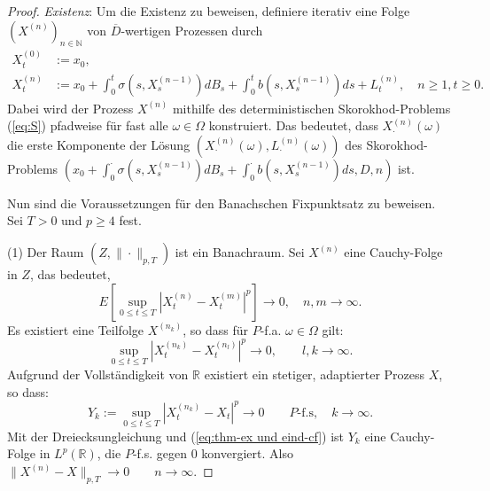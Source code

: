 \documentclass[10pt, a4paper, leqno, twoside, bibliography=totocnumbered, final]{scrartcl}
\theoremstyle{definition}
\theoremstyle{plain}%
\theoremstyle{remark}
\begin{document}
\begin{proof}
\emph{Existenz}: Um die Existenz zu beweisen, definiere iterativ eine Folge $ (X^{(n)})_{n \in \mathbb{N}} $ von $ \overline{D} $-wertigen Prozessen durch
\begin{align*}
X_{t}^{(0)} & := x_{0},\\
X_{t}^{(n)} & := x_{0} + \int_0^t \sigma (s, X_{s}^{(n-1)}) dB_s + \int_0^t b(s, X_{s}^{(n-1)}) ds + L^{(n)}_t, \quad n \geq 1, t \geq 0.
\end{align*}
Dabei wird der Prozess $ X^{(n)} $ mithilfe des deterministischen Skorokhod-Problems (\ref{eq:S}) pfadweise für fast alle $ \omega \in \Omega $ konstruiert. Das bedeutet, dass $ X^{(n)}_{\cdot}(\omega) $ die erste Komponente der Lösung $ ( X^{(n)}_{\cdot}(\omega), L^{(n)}_{\cdot}(\omega) ) $ des Skorokhod-Problems $ (x_{0} + \int_0^{\cdot} \sigma (s, X_{s}^{(n-1)}) dB_s + \int_0^{\cdot} b(s, X_{s}^{(n-1)}) ds, D, n ) $ ist.

Nun sind die Voraussetzungen für den Banachschen Fixpunktsatz zu beweisen. Sei $ T >0 $ und $ p \geq 4 $ fest.

(1) Der Raum $ ( Z , \| \cdot \|_{p,T} ) $ ist ein Banachraum.
Sei $ X^{(n)} $ eine Cauchy-Folge in $ Z $, das bedeutet,
\begin{equation}
\label{eq:thm-ex und eind-cf}
E \left[ \sup_{0 \leq t \leq T} \left| X^{(n)}_t - X^{(m)}_t \right|^p  \right] \to 0, \quad n,m \to \infty.
\end{equation}
Es existiert eine Teilfolge $ X^{(n_k)} $, so dass für $ P $-f.a. $ \omega \in \Omega $ gilt:
\begin{equation*}
\sup_{0 \leq t \leq T} \left| X^{(n_k)}_t - X^{(n_l)}_t \right|^p \to 0, \qquad l,k \to \infty.
\end{equation*}
Aufgrund der Vollständigkeit von $ \mathbb{R} $ existiert ein stetiger, adaptierter Prozess $ X $, so dass:
\begin{equation*}
Y_k := \sup_{0 \leq t \leq T} \left| X_t^{(n_k)} - X_t \right|^p \to 0 \qquad P\text{-f.s}, \quad k \to \infty.
\end{equation*}
Mit der Dreiecksungleichung und (\ref{eq:thm-ex und eind-cf}) ist $ Y_k $ eine Cauchy-Folge in $ L^p(\mathbb{R}) $, die $ P $-f.s. gegen 0 konvergiert. Also $ \| X^{(n)} - X \|_{p,T} \to 0 \qquad n\to \infty $.
\newline


\end{proof}
\end{document}
